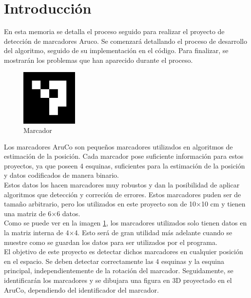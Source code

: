 \documentclass{article}
\begin{document}
\tableofcontents
\newpage

\section{Introducción}
\label{introduction}

En esta memoria se detalla el proceso seguido para realizar el proyecto de detección de marcadores Aruco. Se comenzará detallando el proceso de desarrollo del algoritmo, seguido de su implementación en el código. Para finalizar, se mostrarán los problemas que han aparecido durante el proceso.\\

\begin{figure}
  \vspace*{-1em}
  \begin{center}
    \includegraphics[width=0.25\textwidth]{../util/aruco_images/4x4_1000-0.png}
  \end{center}
  \vspace*{-2em}  
  \caption{Marcador}
  \label{fig:marker}
\end{figure}

Los marcadores AruCo son pequeños marcadores utilizados en algoritmos de estimación de la posición. Cada marcador pose suficiente información para estos proyectos, ya que poseen 4 esquinas, suficientes para la estimación de la posición y datos codificados de manera binario.\\
Estos datos los hacen marcadores muy robustos y dan la posibilidad de aplicar algoritmos que detección y correción de errores. Estos marcadores puden ser de tamaño arbitrario, pero los utilizados en este proyecto son de 10$\times$10 cm y tienen una matriz de 6$\times$6 datos.\\
Como se puede ver en la imagen \ref{fig:marker}, los marcadores utilizados solo tienen datos en la matriz interna de 4$\times$4. Esto será de gran utilidad más adelante cuando se muestre como se guardan los datos para ser utilizados por el programa.\\

El objetivo de este proyecto es detectar dichos marcadores en cualquier posición en el espacio. Se deben detectar correctamente las 4 esquinas y la esquina principal, independientemente de la rotación del marcador. Seguidamente, se identificarán los marcadores y se dibujara una figura en 3D proyectado en el AruCo, dependiendo del identificador del marcador.
\end{document}
